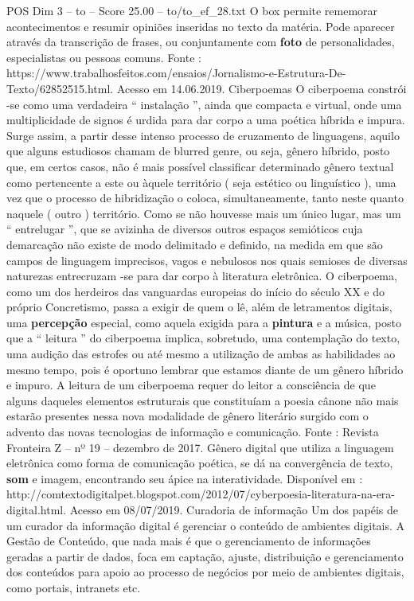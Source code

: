 \begin{textsample}{POS Dim 3 – to – Score 25.00 – to/to\_ef\_28.txt}
O box permite rememorar acontecimentos e resumir opiniões inseridas no texto da matéria.
Pode aparecer através da transcrição de frases, ou conjuntamente com \textbf{foto} de personalidades, especialistas ou pessoas comuns.
Fonte : https://www.trabalhosfeitos.com/ensaios/Jornalismo-e-Estrutura-De-Texto/62852515.html.
Acesso em 14.06.2019.
Ciberpoemas O ciberpoema constrói -se como uma verdadeira “ instalação ”, ainda que compacta e virtual, onde uma multiplicidade de signos é urdida para dar corpo a uma poética híbrida e impura.
Surge assim, a partir desse intenso processo de cruzamento de linguagens, aquilo que alguns estudiosos chamam de blurred genre, ou seja, gênero híbrido, posto que, em certos casos, não é mais possível classificar determinado gênero textual como pertencente a este ou àquele território ( seja estético ou linguístico ), uma vez que o processo de hibridização o coloca, simultaneamente, tanto neste quanto naquele ( outro ) território.
Como se não houvesse mais um único lugar, mas um “ entrelugar ”, que se avizinha de diversos outros espaços semióticos cuja demarcação não existe de modo delimitado e definido, na medida em que são campos de linguagem imprecisos, vagos e nebulosos nos quais semioses de diversas naturezas entrecruzam -se para dar corpo à literatura eletrônica.
O ciberpoema, como um dos herdeiros das vanguardas europeias do início do século XX e do próprio Concretismo, passa a exigir de quem o lê, além de letramentos digitais, uma \textbf{percepção} especial, como aquela exigida para a \textbf{pintura} e a música, posto que a “ leitura ” do ciberpoema implica, sobretudo, uma contemplação do texto, uma audição das estrofes ou até mesmo a utilização de ambas as habilidades ao mesmo tempo, pois é oportuno lembrar que estamos diante de um gênero híbrido e impuro.
A leitura de um ciberpoema requer do leitor a consciência de que alguns daqueles elementos estruturais que constituíam a poesia cânone não mais estarão presentes nessa nova modalidade de gênero literário surgido com o advento das novas tecnologias de informação e comunicação.
Fonte : Revista Fronteira Z – nº 19 – dezembro de 2017.
Gênero digital que utiliza a linguagem eletrônica como forma de comunicação poética, se dá na convergência de texto, \textbf{som} e imagem, encontrando seu ápice na interatividade.
Disponível em : http://comtextodigitalpet.blogspot.com/2012/07/cyberpoesia-literatura-na-era-digital.html.
Acesso em 08/07/2019.
Curadoria de informação Um dos papéis de um curador da informação digital é gerenciar o conteúdo de ambientes digitais.
A Gestão de Conteúdo, que nada mais é que o gerenciamento de informações geradas a partir de dados, foca em captação, ajuste, distribuição e gerenciamento dos conteúdos para apoio ao processo de negócios por meio de ambientes digitais, como portais, intranets etc.

\end{textsample}
